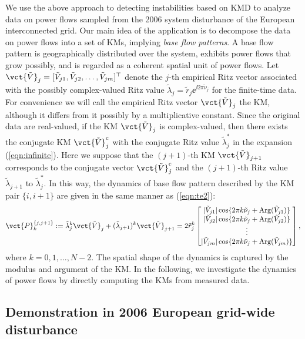 \documentclass[a4paper,10pt]{article}
\begin{document}
%
We use the above approach to detecting instabilities based on KMD to analyze data on power flows sampled from the 2006 system disturbance of the European interconnected grid.  
Our main idea of the application is to decompose the data on power flows into a set of KMs, implying \emph{base flow patterns}.  
A base flow pattern is geographically distributed over the system, exhibits power flows that grow possibly, and is regarded as a coherent spatial unit of power flows.   
Let $\vct{\tilde{V}}_j=[\tilde{V}_{j1},\tilde{V}_{j2},\ldots,\tilde{V}_{jm}]^\top$ denote the $j$-th empirical Ritz vector associated with the possibly complex-valued Ritz value $\tilde{\lambda}_j=\tilde{r}_j\ee^{\ii 2\pi\tilde{\nu}_j}$ for the finite-time data.  
For convenience we will call the empirical Ritz vector $\vct{\tilde{V}}_j$ the KM, although it differs from it possibly by a multiplicative constant.  
Since the original data are real-valued, if the KM $\vct{\tilde{V}}_j$ is complex-valued, then there exists the conjugate KM $\vct{\tilde{V}}_j^\mathrm{c}$ with the conjugate Ritz value $\tilde{\lambda}_j^\ast$ in the expansion (\ref{eqn:infinite}).  
Here we suppose that the $(j+1)$-th KM $\vct{\tilde{V}}_{j+1}$ corresponds to the conjugate vector $\vct{\tilde{V}}_j^\mathrm{c}$ and the $(j+1)$-th Ritz value $\tilde{\lambda}_{j+1}$ to $\tilde{\lambda}^\ast_j$.  
In this way, the dynamics of base flow pattern described by the KM pair $\{i,i+1\}$ are given in the same manner as (\ref{eqn:te2}):  
\begin{equation}
\vct{P}^{\{j,j+1\}}_k
:=\tilde{\lambda}^k_j\vct{\tilde{V}}_j+(\tilde{\lambda}_{j+1})^k\vct{\tilde{V}}_{j+1}
= 2\tilde{r}^k_j
\begin{bmatrix}
|\tilde{V}_{j1}|\cos\{2\pi k\tilde{\nu}_j+\mathrm{Arg}(\tilde{V}_{j1})\}\\
|\tilde{V}_{j2}|\cos\{2\pi k\tilde{\nu}_j+\mathrm{Arg}(\tilde{V}_{j2})\}\\
\vdots\\
|\tilde{V}_{jm}|\cos\{2\pi k\tilde{\nu}_j+\mathrm{Arg}(\tilde{V}_{jm})\}
\end{bmatrix},
\label{eqn:baseflow}
\end{equation}
where $k=0,1,\ldots,N-2$.  
The spatial shape of the dynamics is captured by the modulus and argument of the KM.  
In the following, we investigate the dynamics of power flows by directly computing the KMs from measured data.  


\subsection{Demonstration in 2006 European grid-wide disturbance}
\label{subsec:stability-Europe}
\end{document}
